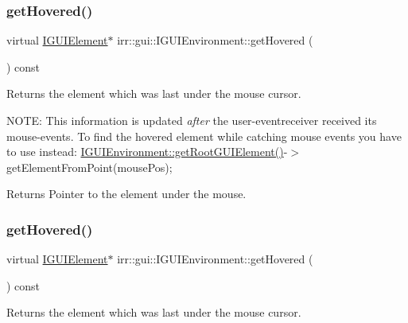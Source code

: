 \subsubsection{\texorpdfstring{get\+Hovered()}{getHovered()}\hspace{0.1cm}{\footnotesize\ttfamily [1/2]}}
{\footnotesize\ttfamily virtual \hyperlink{classirr_1_1gui_1_1IGUIElement}{I\+G\+U\+I\+Element}$\ast$ irr\+::gui\+::\+I\+G\+U\+I\+Environment\+::get\+Hovered (\begin{DoxyParamCaption}{ }\end{DoxyParamCaption}) const\hspace{0.3cm}{\ttfamily [pure virtual]}}



Returns the element which was last under the mouse cursor. 

N\+O\+TE\+: This information is updated {\itshape after} the user-\/eventreceiver received it\textquotesingle{}s mouse-\/events. To find the hovered element while catching mouse events you have to use instead\+: \hyperlink{classirr_1_1gui_1_1IGUIEnvironment_a35fec6d5baa9b2f65aa9ee2c336104d4}{I\+G\+U\+I\+Environment\+::get\+Root\+G\+U\+I\+Element()}-\/$>$get\+Element\+From\+Point(mouse\+Pos); \begin{DoxyReturn}{Returns}
Pointer to the element under the mouse. 
\end{DoxyReturn}
\mbox{\label{classirr_1_1gui_1_1IGUIEnvironment_a00fa645d517a276553b78fc1d0e78591}} 
\subsubsection{\texorpdfstring{get\+Hovered()}{getHovered()}\hspace{0.1cm}{\footnotesize\ttfamily [2/2]}}
{\footnotesize\ttfamily virtual \hyperlink{classirr_1_1gui_1_1IGUIElement}{I\+G\+U\+I\+Element}$\ast$ irr\+::gui\+::\+I\+G\+U\+I\+Environment\+::get\+Hovered (\begin{DoxyParamCaption}{ }\end{DoxyParamCaption}) const\hspace{0.3cm}{\ttfamily [pure virtual]}}



Returns the element which was last under the mouse cursor. 

